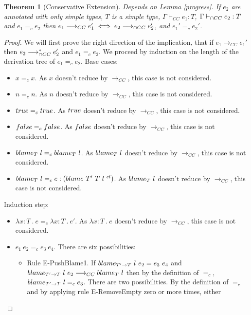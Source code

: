 \documentclass[a4paper]{article}
\newtheorem{theorem}{Theorem}[section]
\begin{document}
\begin{theorem}[Conservative Extension]
\label{conservative_extension_intersection_cast_insertion}
Depends on Lemma \ref{progress}.
If $e_2$ are annotated with only simple types, $T$ is a simple type, $\Gamma \vdash_{CC} e_1 : T$, $\Gamma \vdash_{\cap CC} e_2 : T$ and $e_1 =_{c} e_2$ then $e_1 \longrightarrow_{CC} e_1' \iff e_2 \longrightarrow_{\cap CC} e_2'$, and $e_1' =_{c} e_2'$.
\end{theorem}
\begin{proof}
We will first prove the right direction of the implication, that if $e_1 \longrightarrow_{CC} e_1'$ then $e_2 \longrightarrow_{\cap CC}^* e_2'$ and $e_1 =_{c} e_2$.
We proceed by induction on the length of the derivation tree of $e_1 =_c e_2$.
Base cases:
\begin{itemize}
    \item $x =_c x$.
    As $x$ doesn't reduce by $\longrightarrow_{CC}$, this case is not considered.
    \item $n =_c n$.
    As $n$ doesn't reduce by $\longrightarrow_{CC}$, this case is not considered.
    \item $true =_c true$.
    As $true$ doesn't reduce by $\longrightarrow_{CC}$, this case is not considered.
    \item $false =_c false$.
    As $false$ doesn't reduce by $\longrightarrow_{CC}$, this case is not considered.
    \item $blame_{T}\ l =_c blame_{T}\ l$.
    As $blame_{T}\ l$ doesn't reduce by $\longrightarrow_{CC}$, this case is not considered.
    \item $blame_{T}\ l =_c e : (blame\ T'\ T\ l\ ^{cl})$.
    As $blame_{T}\ l$ doesn't reduce by $\longrightarrow_{CC}$, this case is not considered.
\end{itemize}
Induction step:
\begin{itemize}
    \item $\lambda x : T\ .\ e =_c \lambda x : T\ .\ e'$.
    As $\lambda x : T\ .\ e$ doesn't reduce by $\longrightarrow_{CC}$, this case is not considered.
    \item $e_1\ e_2 =_c e_3\ e_4$.
    There are six possibilities:
    \begin{itemize}
        \item Rule E-PushBlame1.
        If $blame_{T' \rightarrow T}\ l\ e_2 = e_3\ e_4$ and $blame_{T' \rightarrow T}\ l\ e_2 \longrightarrow_{CC} blame_{T}\ l$ then by the definition of $=_c$, $blame_{T' \rightarrow T}\ l =_c e_3$.
        There are two possibilities.
        By the definition of $=_c$ and by applying rule E-RemoveEmpty zero or more times, either

\end{itemize}
\end{itemize}
\end{proof}
\end{document}
